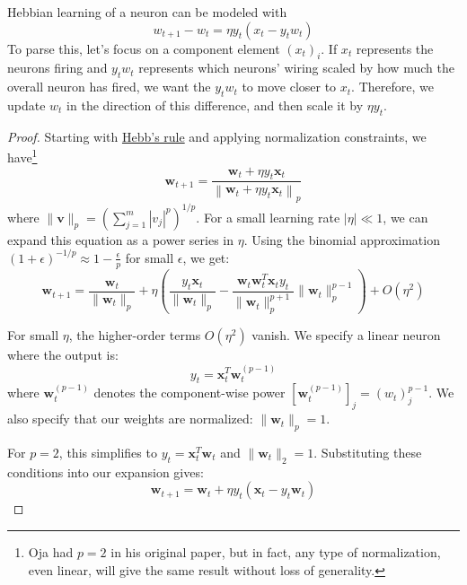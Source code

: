   \begin{theorem}
    \label{thm:ojas-rule}
    Hebbian learning of a neuron can be modeled with
    \begin{equation}
      w_{t+1} - w_t = \eta y_t (x_t - y_t w_t)
    \end{equation}
    To parse this, let's focus on a component element $(x_t)_i$. If $x_t$ represents the neurons firing and $y_t w_t$ represents which neurons' wiring scaled by how much the overall neuron has fired, we want the $y_t w_t$ to move closer to $x_t$. Therefore, we update $w_t$ in the direction of this difference, and then scale it by $\eta y_t$. 
  \end{theorem}
  \begin{proof}
    Starting with \hyperref[def:hebbs-rule]{Hebb's rule} and applying normalization constraints, we have\footnote{Oja had $p = 2$ in his original paper, but in fact, any type of normalization, even linear, will give the same result without loss of generality.}
    \begin{equation}
      \mathbf{w}_{t+1} = \frac{\mathbf{w}_t + \eta y_t \mathbf{x}_t}{\left\|\mathbf{w}_t + \eta y_t \mathbf{x}_t\right\|_p}
    \end{equation}
    where $\|\mathbf{v}\|_p = \left(\sum_{j=1}^{m} |v_j|^p\right)^{1/p}$. For a small learning rate $|\eta| \ll 1$, we can expand this equation as a power series in $\eta$. Using the binomial approximation $(1 + \epsilon)^{-1/p} \approx 1 - \frac{\epsilon}{p}$ for small $\epsilon$, we get:
    \begin{equation}
      \mathbf{w}_{t+1} = \frac{\mathbf{w}_t}{\|\mathbf{w}_t\|_p} + \eta \left(\frac{y_t\mathbf{x}_t}{\|\mathbf{w}_t\|_p} - \frac{\mathbf{w}_t \mathbf{w}_t^T \mathbf{x}_t y_t}{\|\mathbf{w}_t\|_p^{p+1}} \|\mathbf{w}_t\|_p^{p-1}\right) + O(\eta^2)
    \end{equation}
   
    For small $\eta$, the higher-order terms $O(\eta^2)$ vanish. We specify a linear neuron where the output is:
    \begin{equation}
      y_t = \mathbf{x}_t^T \mathbf{w}_t^{(p-1)}
    \end{equation}
    where $\mathbf{w}_t^{(p-1)}$ denotes the component-wise power $[\mathbf{w}_t^{(p-1)}]_j = (w_t)_j^{p-1}$. We also specify that our weights are normalized: $\|\mathbf{w}_t\|_p = 1$. 
   
    For $p = 2$, this simplifies to $y_t = \mathbf{x}_t^T \mathbf{w}_t$ and $\|\mathbf{w}_t\|_2 = 1$. Substituting these conditions into our expansion gives:
    \begin{equation}
      \mathbf{w}_{t+1} = \mathbf{w}_t + \eta y_t(\mathbf{x}_t - y_t\mathbf{w}_t)
    \end{equation}
  \end{proof}

